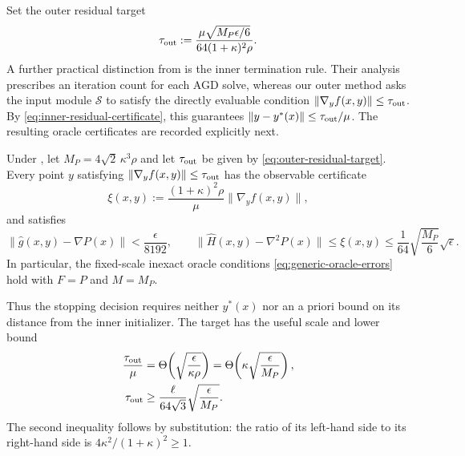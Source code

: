\documentclass{article}
\begin{document}
Set the outer residual target
\begin{equation}\label{eq:outer-residual-target}
 \tau_{\rm out}:=
 \frac{\mu\sqrt{M_P\epsilon/6}}
      {64(1+\kappa)^2\rho}.
\end{equation}
A further practical distinction from
\citet[Algorithm~2 and Theorem~2]{luo2022finding} is the inner
termination rule.  Their analysis prescribes an iteration count for
each AGD solve, whereas our outer method asks the input module
$\mathcal S$ to satisfy the directly evaluable condition
$\|\nabla_yf(x,y)\|\le\tau_{\rm out}$.  By
\eqref{eq:inner-residual-certificate}, this guarantees
$\|y-y^*(x)\|\le\tau_{\rm out}/\mu$.  The resulting oracle
certificates are recorded explicitly next.

\begin{corollary}
\label{cor:ncsc-fixed-oracle}
Under , let
$M_P=4\sqrt2\,\kappa^3\rho$ and let $\tau_{\rm out}$ be given by
\eqref{eq:outer-residual-target}.  Every point $y$ satisfying
$\|\nabla_yf(x,y)\|\le\tau_{\rm out}$ has the observable certificate
\begin{equation}\label{eq:ncsc-hessian-certificate}
 \xi(x,y):=\frac{(1+\kappa)^2\rho}{\mu}
              \|\nabla_yf(x,y)\|,
\end{equation}
and satisfies
\begin{equation}\label{eq:ncsc-fixed-oracle-errors}
 \|\widehat g(x,y)-\nabla P(x)\|<\frac{\epsilon}{8192},
 \qquad
 \|\widehat H(x,y)-\nabla^2P(x)\|\le\xi(x,y)
 \le\frac1{64}\sqrt{\frac{M_P}{6}}\sqrt\epsilon.
\end{equation}
In particular, the fixed-scale inexact oracle conditions
\eqref{eq:generic-oracle-errors} hold with $F=P$ and $M=M_P$.
\end{corollary}

Thus the stopping decision requires neither $y^*(x)$ nor an a priori
bound on its distance from the inner initializer.
The target has the useful scale and lower bound
\begin{subequations}\label{eq:outer-residual-scale}
\begin{align}
 \frac{\tau_{\rm out}}\mu
 &=\Theta\!\left(\sqrt{\frac{\epsilon}{\kappa\rho}}\right)
 =\Theta\!\left(\kappa\sqrt{\frac{\epsilon}{M_P}}\right),
 \label{eq:outer-residual-distance-scale}\\
 \tau_{\rm out}
 &\ge\frac{\ell}{64\sqrt3}
       \sqrt{\frac\epsilon{M_P}}.
 \label{eq:outer-residual-lower}
\end{align}
\end{subequations}
The second inequality follows by substitution: the ratio of its
left-hand side to its right-hand side is
$4\kappa^2/(1+\kappa)^2\ge1$.
\end{document}
